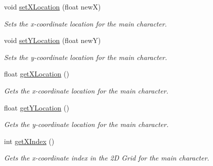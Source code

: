 \begin{DoxyCompactItemize}
\mbox{\label{class_main_character_a89c983b6e89523e59510dccd5a5d43d7}} 
void \mbox{\hyperlink{class_main_character_a89c983b6e89523e59510dccd5a5d43d7}{set\+X\+Location}} (float newX)
\begin{DoxyCompactList}\small\item\em Sets the x-\/coordinate location for the main character. \end{DoxyCompactList}\item 
\mbox{\label{class_main_character_a6d78e7c96db26d9544cd745644c4ec52}} 
void \mbox{\hyperlink{class_main_character_a6d78e7c96db26d9544cd745644c4ec52}{set\+Y\+Location}} (float newY)
\begin{DoxyCompactList}\small\item\em Sets the y-\/coordinate location for the main character. \end{DoxyCompactList}\item 
\mbox{\label{class_main_character_a48c6e280e68d400e3eeac2f33fb194ff}} 
float \mbox{\hyperlink{class_main_character_a48c6e280e68d400e3eeac2f33fb194ff}{get\+X\+Location}} ()
\begin{DoxyCompactList}\small\item\em Gets the x-\/coordinate location for the main character. \end{DoxyCompactList}\item 
\mbox{\label{class_main_character_aa802ffc7d85805d5dffc4d3700fcee7d}} 
float \mbox{\hyperlink{class_main_character_aa802ffc7d85805d5dffc4d3700fcee7d}{get\+Y\+Location}} ()
\begin{DoxyCompactList}\small\item\em Gets the y-\/coordinate location for the main character. \end{DoxyCompactList}\item 
\mbox{\label{class_main_character_ada944ad8a6d59cf191143db40449cfe4}} 
int \mbox{\hyperlink{class_main_character_ada944ad8a6d59cf191143db40449cfe4}{get\+X\+Index}} ()
\begin{DoxyCompactList}\small\item\em Gets the x-\/coordinate index in the 2D Grid for the main character. \end{DoxyCompactList}\item 

\end{DoxyCompactItemize}
